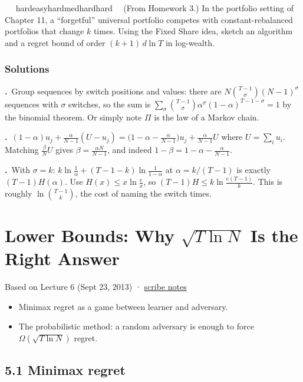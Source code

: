 \documentclass[11pt,a4paper,openany]{book}
\newcommand{\chapsource}[1]{{\small\sffamily\color{muted}#1\par}\medskip}
\newcommand{\extag}[2]{%
  \def\tmp{#1}\def\tmpE{easy}\def\tmpM{med}\def\tmpH{hard}%
  \ifx\tmp\tmpE\def\tagc{defc}\else\ifx\tmp\tmpM\def\tagc{thmc}\else\ifx\tmp\tmpH\def\tagc{warnc}\else\def\tagc{finc}\fi\fi\fi
  \tcbox[on line,boxrule=0pt,arc=2pt,colback=\tagc!12,left=2pt,right=2pt,top=0pt,bottom=0pt,boxsep=1pt]{\sffamily\scriptsize\bfseries\color{\tagc}#2}}
\newcommand{\exercise}[3]{\par\medskip\noindent\textbf{\sffamily #1}\ \ #2\ \ #3\par}
\newenvironment{solutions}{\small}{}
\newcommand{\sol}[2]{\par\smallskip\noindent\textbf{\sffamily #1.}\ #2\par}
\begin{document}
\exercise{4.4}{\extag{hard}{challenge}}{\hypertarget{sol-4.4}{}(From Homework 3.) In the portfolio setting of Chapter 11, a ``forgetful'' universal portfolio competes with constant-rebalanced portfolios that change $k$ times. Using the Fixed Share idea, sketch an algorithm and a regret bound of order $(k+1)\,d\ln T$ in log-wealth.}

\subsection*{Solutions}
\begin{solutions}
\sol{4.1}{Group sequences by switch positions and values: there are $N\binom{T-1}{\sigma}(N-1)^\sigma$ sequences with $\sigma$ switches, so the sum is $\sum_\sigma\binom{T-1}{\sigma}\alpha^\sigma(1-\alpha)^{T-1-\sigma}=1$ by the binomial theorem. Or simply note $\Pi$ is the law of a Markov chain.}
\sol{4.2}{$(1-\alpha)u_j+\frac{\alpha}{N-1}(U-u_j)=\big(1-\alpha-\frac{\alpha}{N-1}\big)u_j+\frac{\alpha}{N-1}U$ where $U=\sum_iu_i$. Matching $\frac{\beta}{N}U$ gives $\beta=\frac{\alpha N}{N-1}$, and indeed $1-\beta=1-\alpha-\frac{\alpha}{N-1}$.}
\sol{4.3}{With $\sigma=k$: $k\ln\frac1\alpha+(T-1-k)\ln\frac1{1-\alpha}$ at $\alpha=k/(T-1)$ is exactly $(T-1)H(\alpha)$. Use $H(x)\le x\ln\frac ex$, so $(T-1)H\le k\ln\frac{e(T-1)}k$. This is roughly $\ln\binom{T-1}{k}$, the cost of naming the switch times.}
\end{solutions}

\chapter[Lower bounds]{Lower Bounds: Why $\sqrt{T\ln N}$ Is the Right Answer}\label{ch5}
\chapsource{Based on Lecture 6 (Sept 23, 2013) · \href{https://web.eecs.umich.edu/~jabernet/eecs598course/fall2013/web/notes/lec6_092313.pdf}{scribe notes}}

\begin{goals}
\begin{itemize}
\item Minimax regret as a game between learner and adversary.
\item The probabilistic method: a random adversary is enough to force $\Omega(\sqrt{T\ln N})$ regret.
\end{itemize}
\end{goals}

\section*{5.1 Minimax regret}\label{ch5-minimax}
\end{document}

